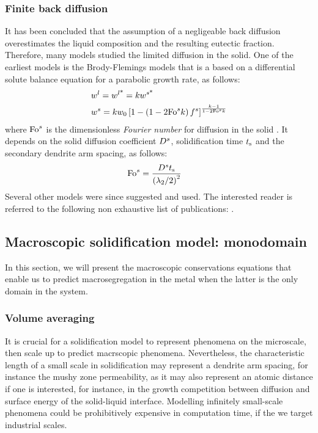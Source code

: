 \subsubsection*{Finite back diffusion}
It has been concluded that the assumption of a negligeable back diffusion overestimates the liquid composition
and the resulting eutectic fraction. Therefore, many models studied the limited diffusion in the solid. One of the earliest models is the Brody-Flemings models \citep{khan_influence_2014} that is a based on a differential solute balance equation for a parabolic growth rate, as follows:
\begin{align}
\label{eq:brodyflemings}
& {w}^l= {w}^{l \text{*}}  = k {w}^{s \text{*}}  \\
& {w}^s= k {w}_0 \left[  1 - \left(  1 - 2 \text{Fo}^s k  \right) {f^s}  \right]^{\frac{k-1}{1 - 2 \text{Fo}^s k }}
\end{align}
where $\text{Fo}^s$ is the dimensionless \emph{Fourier number} for diffusion in the solid \citep{dantzig_solidification_2009}. It depends on the 
solid diffusion coefficient $D^s$, solidification time $t_\text{s}$ and the secondary dendrite arm spacing, as follows: 
\begin{align}
\label{eq:fouriersolid}
& \text{Fo}^s = \frac{D^s t_\text{s}}{\left( {\lambda}_{2} / 2 \right)^2}
\end{align}
Several other models were since suggested and used. The interested reader is referred to the following non exhaustive list of publications: \citet{clyne_solute_1981,kobayashi_solute_1988,ni_volume-averaged_1991,wang_multiphase_1993,combeau_modeling_1996,martorano_solutal_2003,tourret_generalized_2009}.
\subsection{Macroscopic solidification model: monodomain}
In this section, we will present the macroscopic conservations equations that enable us to predict 
macrosegregation in the metal when the latter is the only domain in the system.
\subsubsection{Volume averaging}
It is crucial for a solidification model to represent phenomena on the microscale, then scale up to predict 
macrscopic phenomena. Nevertheless, the characteristic length of a small scale in solidification may represent a dendrite arm spacing, for instance the mushy zone permeability, as it may also represent an atomic distance if one is interested, for instance, in the growth competition between diffusion and surface energy of the solid-liquid interface. Modelling infinitely small-scale phenomena could be prohibitively expensive in computation time, if the we target industrial scales. 

